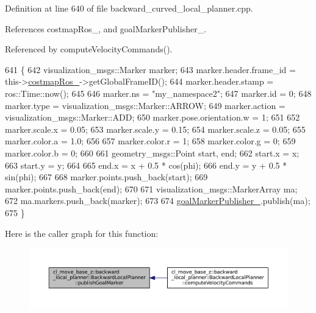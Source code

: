 Definition at line 640 of file backward\+\_\+curved\+\_\+local\+\_\+planner.\+cpp.



References costmap\+Ros\+\_\+, and goal\+Marker\+Publisher\+\_\+.



Referenced by compute\+Velocity\+Commands().


\begin{DoxyCode}
641         \{
642             visualization\_msgs::Marker marker;
643             marker.header.frame\_id = this->\hyperlink{classcl__move__base__z_1_1backward__local__planner_1_1BackwardLocalPlanner_a4136268882a105d9e06e173d85d5c0dc}{costmapRos\_}->getGlobalFrameID();
644             marker.header.stamp = ros::Time::now();
645 
646             marker.ns = \textcolor{stringliteral}{"my\_namespace2"};
647             marker.id = 0;
648             marker.type = visualization\_msgs::Marker::ARROW;
649             marker.action = visualization\_msgs::Marker::ADD;
650             marker.pose.orientation.w = 1;
651 
652             marker.scale.x = 0.05;
653             marker.scale.y = 0.15;
654             marker.scale.z = 0.05;
655             marker.color.a = 1.0;
656 
657             marker.color.r = 1;
658             marker.color.g = 0;
659             marker.color.b = 0;
660 
661             geometry\_msgs::Point start, end;
662             start.x = x;
663             start.y = y;
664 
665             end.x = x + 0.5 * cos(phi);
666             end.y = y + 0.5 * sin(phi);
667 
668             marker.points.push\_back(start);
669             marker.points.push\_back(end);
670 
671             visualization\_msgs::MarkerArray ma;
672             ma.markers.push\_back(marker);
673 
674             \hyperlink{classcl__move__base__z_1_1backward__local__planner_1_1BackwardLocalPlanner_a79f0ddfa686e2cd47bbc2f0bac9f3d4c}{goalMarkerPublisher\_}.publish(ma);
675         \}
\end{DoxyCode}
Here is the caller graph for this function\+:
\nopagebreak
\begin{figure}[H]
\begin{center}
\leavevmode
\includegraphics[width=350pt]{classcl__move__base__z_1_1backward__local__planner_1_1BackwardLocalPlanner_a70eaeb6cf31fd3378d9fbf9bcb975995_icgraph}
\end{center}
\end{figure}
